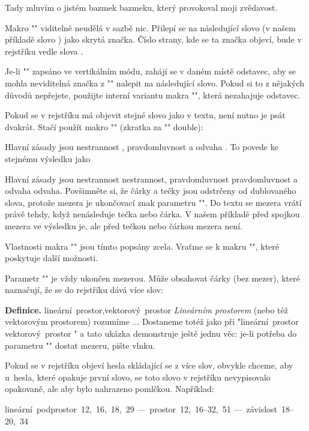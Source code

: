 \begtt
Tady mluvím o jistém
\ii bazmek
bazmeku, který provokoval moji zvědavost.
\endtt

Makro "\ii" viditelně neudělá v sazbě nic. Přilepí se na následující slovo (v
našem příkladě slovo ) jako skrytá značka. Číslo strany,
kde se ta značka objeví, bude v rejstříku vedle slova .

Je-li "\ii" zapsáno ve vertikálním módu, zahájí se v daném místě odstavec,
aby se mohla neviditelná značka z "\ii" nalepit na následující slovo. Pokud
si to z nějakých důvodů nepřejete, použijte interní variantu makra
"", která nezahajuje odstavec.

Pokud se v rejstříku má objevit stejné slovo jako v textu, není nutno je psát
dvakrát. Stačí použít makro "\iid" (zkratka za "\ii" double):

\begtt
Hlavní zásady jsou \iid nestrannost , \iid pravdomluvnost a \iid odvaha .
\endtt
%
To povede ke stejnému výsledku jako

\begtt
Hlavní zásady jsou \ii nestrannost nestrannost,
\ii pravdomluvnost pravdomluvnost a \ii odvaha odvaha.
\endtt
%
Povšimněte si, že čárky a tečky jsou odstrčeny od dublovaného slova, protože
mezera je ukončovací znak parametru "\iid". Do textu se mezera vrátí právě
tehdy, když nenásleduje tečka nebo čárka. V našem příkladě před spojkou 
mezera ve výsledku je, ale před tečkou nebo čárkou mezera není.

Vlastnosti makra "\iid" jsou tímto popsány zcela. Vraťme se k makru "\ii",
které poskytuje další možnosti.

Parametr "\ii" je vždy ukončen mezerou. Může obsahovat čárky (bez mezer),
které naznačují, že se do rejstříku dává více slov:

\begtt
{\bf Definice.}
\ii lineární~prostor,vektorový~prostor
{\em Lineárním prostorem} (nebo též vektorovým prostorem) rozumíme ...
\endtt
%
Dostaneme totéž jako při "\ii lineární~prostor \ii vektorový~prostor "
a tato ukázka demonstruje ještě jednu věc: je-li potřeba do parametru "\ii"
dostat mezeru, pište vlnku.

Pokud se v rejstříku objeví hesla skládající se z více slov, obvykle chceme,
aby u~hesla, které opakuje první slovo, se toto slovo 
v rejstříku nevypisovalo opakovaně, ale
aby bylo nahrazeno pomlčkou. Například:
\par\nobreak
\medskip
\hbox{\indent lineární podprostor 12, 16, 18, 29}\nobreak
\hbox{\indent \space --- prostor 12, 16--32, 51}\nobreak
\hbox{\indent \space --- závislost 18--20, 34}
\medskip

